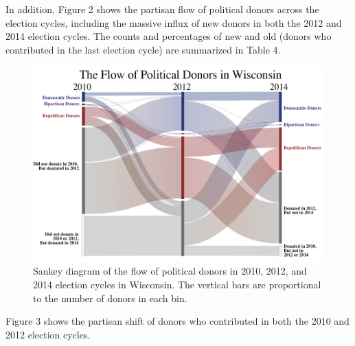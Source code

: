 \documentclass[12pt,]{article}
\begin{document}
In addition, Figure 2 shows the partisan flow of political donors across
the election cycles, including the massive influx of new donors in both
the 2012 and 2014 election cycles. The counts and percentages of new and
old (donors who contributed in the last election cycle) are summarized
in Table 4.

\begin{figure}
\includegraphics[width=1\linewidth]{../figures/fig2} \caption{Sankey diagram of the flow of political donors in 2010, 2012, and 2014 election cycles in Wisconsin. The vertical bars are proportional to the number of donors in each bin.}\label{fig:unnamed-chunk-12}
\end{figure}

Figure 3 shows the partisan shift of donors who contributed in both the
2010 and 2012 election cycles.
\end{document}
